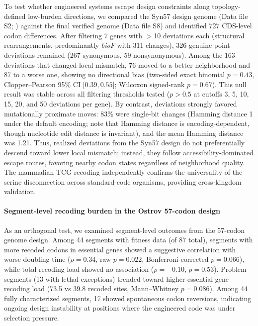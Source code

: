 \documentclass[preprint,11pt,authoryear,a4paper]{elsarticle}
\begin{document}
To test whether engineered systems escape design constraints along
topology-defined low-burden directions, we compared the Syn57 design
genome (Data file S2; \citep{robertson2025syn57}) against the final
verified genome (Data file S8) and identified 727 CDS-level codon
differences. After filtering 7 genes with \(>\)10 deviations each
(structural rearrangements, predominantly \emph{bioF} with 311 changes),
326 genuine point deviations remained (267 synonymous, 59
nonsynonymous). Among the 163 deviations that changed local mismatch, 76
moved to a better neighborhood and 87 to a worse one, showing no
directional bias (two-sided exact binomial \(p = 0.43\),
Clopper--Pearson 95\% CI \(\lbrack 0.39,0.55\rbrack\); Wilcoxon
signed-rank \(p = 0.67\)). This null result was stable across all
filtering thresholds tested (\(p > 0.5\) at cutoffs 3, 5, 10, 15, 20,
and 50 deviations per gene). By contrast, deviations strongly favored
mutationally proximate moves: 83\% were single-bit changes (Hamming
distance 1 under the default encoding; note that Hamming distance is
encoding-dependent, though nucleotide edit distance is invariant), and
the mean Hamming distance was 1.21. Thus, realized deviations from the
Syn57 design do not preferentially descend toward lower local mismatch;
instead, they follow accessibility-dominated escape routes, favoring
nearby codon states regardless of neighborhood quality. The
\citep{ding2024} mammalian TCG recoding independently confirms the
universality of the serine disconnection across standard-code organisms,
providing cross-kingdom validation.

\paragraph{Segment-level recoding burden in the Ostrov 57-codon design}

As an orthogonal test, we examined segment-level outcomes from the
\citep{ostrov2016} 57-codon genome design. Among 44 segments with
fitness data (of 87 total), segments with more recoded codons in
essential genes showed a suggestive correlation with worse doubling time
(\(\rho = 0.34\), raw \(p = 0.022\), Bonferroni-corrected
\(p = 0.066\)), while total recoding load showed no association
(\(\rho = - 0.10\), \(p = 0.53\)). Problem segments (13 with lethal
exceptions) trended toward higher essential-gene recoding load (73.5 vs
39.8 recoded sites, Mann--Whitney \(p = 0.086\)). Among 44 fully
characterized segments, 17 showed spontaneous codon reversions,
indicating ongoing design instability at positions where the engineered
code was under selection pressure.
\end{document}
